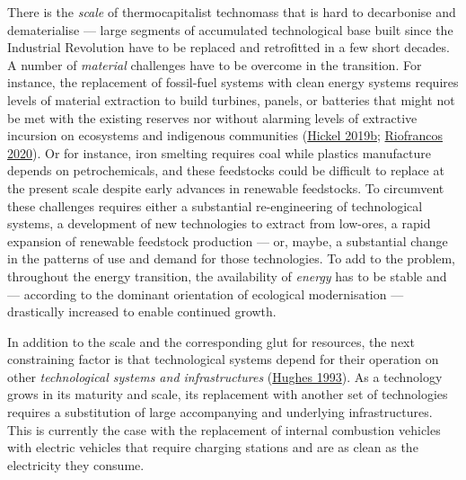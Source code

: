 \documentclass[a4paper, nobind]{templates/ociamthesis}
\begin{document}
There is the \emph{scale} of thermocapitalist technomass that is hard to decarbonise and dematerialise --- large segments of accumulated technological base built since the Industrial Revolution have to be replaced and retrofitted in a few short decades. A number of \emph{material} challenges have to be overcome in the transition. For instance, the replacement of fossil-fuel systems with clean energy systems requires levels of material extraction to build turbines, panels, or batteries that might not be met with the existing reserves nor without alarming levels of extractive incursion on ecosystems and indigenous communities (\protect\hyperlink{ref-hickel_limits_2019}{Hickel 2019b}; \protect\hyperlink{ref-riofrancos_resource_2020}{Riofrancos 2020}). Or for instance, iron smelting requires coal while plastics manufacture depends on petrochemicals, and these feedstocks could be difficult to replace at the present scale despite early advances in renewable feedstocks. To circumvent these challenges requires either a substantial re-engineering of technological systems, a development of new technologies to extract from low-ores, a rapid expansion of renewable feedstock production --- or, maybe, a substantial change in the patterns of use and demand for those technologies. To add to the problem, throughout the energy transition, the availability of \emph{energy} has to be stable and --- according to the dominant orientation of ecological modernisation --- drastically increased to enable continued growth.

In addition to the scale and the corresponding glut for resources, the next constraining factor is that technological systems depend for their operation on other \emph{technological systems and infrastructures} (\protect\hyperlink{ref-hughes_networks_1993}{Hughes 1993}). As a technology grows in its maturity and scale, its replacement with another set of technologies requires a substitution of large accompanying and underlying infrastructures. This is currently the case with the replacement of internal combustion vehicles with electric vehicles that require charging stations and are as clean as the electricity they consume.
\end{document}

